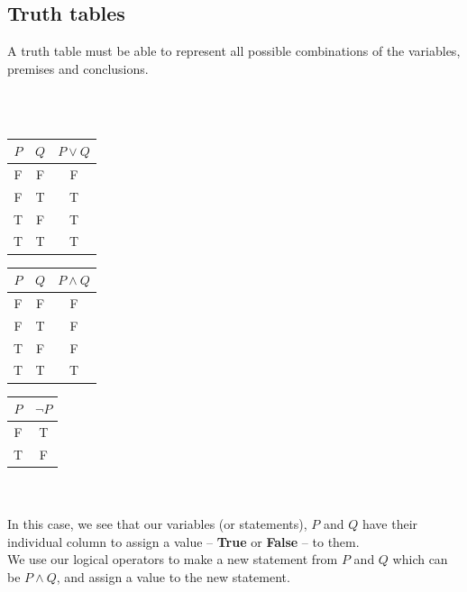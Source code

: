 \documentclass[../setup.tex]{subfiles}
\begin{document}
\subsection{Truth tables}
A truth table must be able to represent all possible combinations of the variables, premises and conclusions.\\
\\

{
\centering
\ \ \ \ \ \ \ \ \ \ \ \ \ \ \ \ \ \ \ \ \ \ \
\begin{minipage}[t]{0.32\textwidth}
	\begin{tabular}[t]{|c|c|c|}
		\hline
		$P$&$Q$&$P\lor Q$ \\
		\hline
		F&F&F \\
		F&T&T \\
		T&F&T \\
		T&T&T \\
		\hline
	\end{tabular}
\end{minipage}
\quad
\begin{minipage}[t]{0.32\textwidth}
	\begin{tabular}[t]{|c|c|c|}
		\hline
		$P$&$Q$&$P\land Q$ \\
		\hline
		F&F&F \\
		F&T&F \\
		T&F&F \\
		T&T&T \\
		\hline
	\end{tabular} 
\end{minipage}
\quad
\begin{minipage}[t]{0.32\textwidth}
	\begin{tabular}[t]{|c|c|}
		\hline
		$P$&$\lnot P$ \\
		\hline
		F&T \\
		T&F \\
		\hline
	\end{tabular}
\end{minipage}
}
\\ 
\\
In this case, we see that our variables (or statements), $P$ and $Q$ have their individual column to assign a value -- \textbf{True} or \textbf{False} -- to them. \\
We use our logical operators to make a new statement from $P$ and $Q$ which can be $P\land Q$, and assign a value to the new statement. \\
\end{document}
